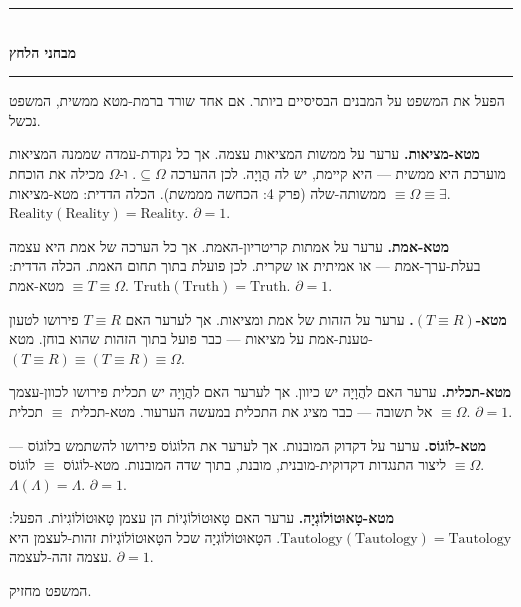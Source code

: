 \documentclass[10pt, openany, oneside]{book}
\renewcommand{\normalsize}{\fontsize{10}{13}\selectfont}
\begin{document}
\vspace{1.5em}


\begin{center}
    \rule{0.3\textwidth}{0.4pt}\\[0.5em]
    {\normalsize\bfseries\textsc{מבחני הלחץ}}\\[0.3em]
    \rule{0.3\textwidth}{0.4pt}
\end{center}

\vspace{1em}

\noindent הפעל את המשפט על המבנים הבסיסיים ביותר. אם אחד שורד ברמת-מטא ממשית, המשפט נכשל.

\textbf{מטא-מציאות.} ערער על ממשות המציאות עצמה. אך כל נקודת-עמדה שממנה המציאות מוערכת היא ממשית — היא קיימת, יש לה הֲוָיָה. לכן ההערכה $\subseteq \Omega$. ו-$\Omega$ מכילה את הוכחת ממשותה-שלה (פרק 4: הכחשה מממשת). הכלה הדדית: מטא-מציאות $\equiv \Omega \equiv \exists$. $\text{Reality}(\text{Reality}) = \text{Reality}$. $\partial = 1$.

\textbf{מטא-אמת.} ערער על אמתות קריטריון-האמת. אך כל הערכה של אמת היא עצמה בעלת-ערך-אמת — או אמיתית או שקרית. לכן פועלת בתוך תחום האמת. הכלה הדדית: מטא-אמת $\equiv T \equiv \Omega$. $\text{Truth}(\text{Truth}) = \text{Truth}$. $\partial = 1$.

\textbf{מטא-$(T \equiv R)$.} ערער על הזהות של אמת ומציאות. אך לערער האם $T \equiv R$ פירושו לטעון טענת-אמת על מציאות — כבר פועל בתוך הזהות שהוא בוחן. מטא-$(T \equiv R) \equiv (T \equiv R) \equiv \Omega$.

\textbf{מטא-תכלית.} ערער האם להֲוָיָה יש כיוון. אך לערער האם להֲוָיָה יש תכלית פירושו לכוון-עצמך אל תשובה — כבר מציג את התכלית במעשה הערעור. מטא-תכלית $\equiv$ תכלית $\equiv \Omega$. $\partial = 1$.

\textbf{מטא-לוֹגוֹס.} ערער על דקדוק המובנות. אך לערער את הלוֹגוֹס פירושו להשתמש בלוֹגוֹס — ליצור התנגדות דקדוקית-מובנית, מובנת, בתוך שדה המובנות. מטא-לוֹגוֹס $\equiv$ לוֹגוֹס $\equiv \Omega$. $\Lambda(\Lambda) = \Lambda$. $\partial = 1$.

\textbf{מטא-טָאוּטוֹלוֹגְיָה.} ערער האם טָאוּטוֹלוֹגְיוֹת הן עצמן טָאוּטוֹלוֹגִיוֹת. הפעל: $\text{Tautology}(\text{Tautology}) = \text{Tautology}$. הטָאוּטוֹלוֹגְיָה שכל הטָאוּטוֹלוֹגְיוֹת זהות-לעצמן היא עצמה זהה-לעצמה. $\partial = 1$.

המשפט מחזיק.
\end{document}

